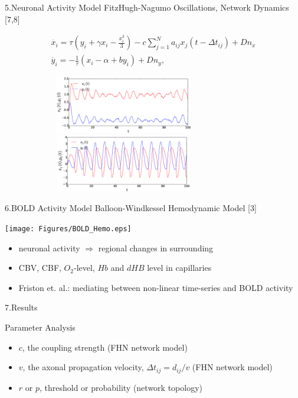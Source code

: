 \documentclass{beamer}
\begin{document}
\begin{frame}{5.Neuronal Activity Model}
\footnotesize{FitzHugh-Nagumo Oscillations, Network Dynamics {\color{blue} [7,8]}}

\begin{subequations}
 \begin{align}\dot{x_i} = \tau \left( y_i + \gamma x_i - \frac{x_i^3}{3} \right) -c \sum_{j=1}^N a_{ij}x_j(t - \Delta t_{ij}) +Dn_x \label{eqn: frobenius 3}\\  \dot{y_i} = -\frac{1}{\tau} (x_i - \alpha + b y_i  ) +Dn_y \label{eqn: frobenius 18}  , \end{align} 
\end{subequations}

  \centering
	\includegraphics[width=0.8\textwidth, height=2.5cm]{Figures/FHN_time_1.eps} \\
 	\includegraphics[width=0.8\textwidth, height=2.5cm]{Figures/FHN_time_2.eps}

\end{frame}

\begin{frame}{6.BOLD Activity Model}
\footnotesize{Balloon-Windkessel Hemodynamic Model [3]}

\centering
\texttt{[image: Figures/BOLD\_Hemo.eps]}

\begin{itemize}
 \item neuronal activity  $\Rightarrow$ regional changes in surrounding
 \item CBV, CBF, $O_2$-level, $Hb$ and $dHB$ level in capillaries 
 \item Friston et. al.: mediating between non-linear time-series and BOLD activity 
\end{itemize}

\end{frame}


\begin{frame}{7.Results}

Parameter Analysis
\begin{itemize}
\item  $c$, the coupling strength (FHN network model) 
\item  $v$, the axonal propagation velocity, $\Delta t_{ij} = d_{ij}/v$ (FHN network model)
\item  $r$ or $p$, threshold or probability (network topology)

\end{itemize}

\end{frame}
\end{document}
